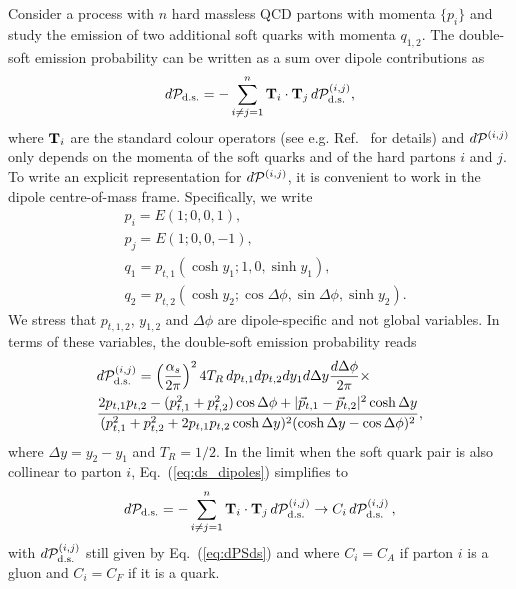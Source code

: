 \documentclass[nofootinbib,twocolumn,preprintnumbers,superscriptaddress,aps]{revtex4-2}
\newcommand{\as}{\alpha_s}
\begin{document}
Consider a process with $n$ hard
massless QCD partons with momenta $\{p_i\}$ and study the emission of
two additional soft quarks with momenta $q_{1,2}$. The double-soft
emission probability can be written as a sum over dipole contributions
as
\begin{equation}
  d\mathcal P_{\rm d.s.} = -\sum_{i\ne j=1}^{n} {\bf T}_i \cdot {\bf T}_j\,
  d\mathcal P^{(i,j)}_{\rm d.s.},
  \label{eq:ds_dipoles}
\end{equation}
where ${\bf T}_i$ are the standard colour operators (see
e.g. Ref.~\cite{Catani:1996vz} for details) and $d\mathcal P^{(i,j)}_{\rm}$ only
depends on the momenta of the soft quarks and of the hard partons $i$
and $j$. To write an explicit representation for $d\mathcal
P^{(i,j)}_{\rm}$, it is convenient to work in the dipole
centre-of-mass frame. Specifically, we write
\begin{align}
  & p_i = E(1;0,0,1),
  \nonumber\\
  & p_j = E(1;0,0,-1),
  \nonumber\\
  & q_1 = p_{t,1} (\cosh y_1;1,0,\sinh y_1),
  \nonumber\\
  & q_2 = p_{t,2} (\cosh y_2;\cos\Delta\phi,\sin\Delta\phi,\sinh y_2).
\end{align}
We stress that $p_{t,{1,2}}$, $y_{1,2}$ and $\Delta\phi$ are dipole-specific
and not global variables.
In terms of these variables, the double-soft emission probability reads
\begin{align}
  \label{eq:dPSds}
  &
  d\mathcal P^{(i,j)}_{\rm d.s.} = 
  \left(\frac{\as}{2\pi}\right)^2
  4  T_R\,
  d p_{t,1} d p_{t,2} d y_1 d\Delta y \frac{d\Delta\phi}{2\pi}\times
  \\
  &
  \frac{2 p_{t,1}p_{t,2} - (p^2_{t,1}+p^2_{t,2})\cos\Delta\phi +
    |\vec p_{t,1}-\vec p_{t,2}|^2 \cosh\Delta y}
       {(p_{t,1}^2 + p_{t,2}^2 + 2 p_{t,1}  p_{t,2} \cosh\Delta y)^2
         (\cosh\Delta y-\cos\Delta\phi)^2},
       \nonumber
\end{align}
where $\Delta y = y_2-y_1$ and $T_R= 1/2$. In the limit when the soft quark
pair is also collinear to parton $i$, Eq.~(\ref{eq:ds_dipoles}) simplifies
to
\begin{equation}
  d\mathcal P_{\rm d.s.} = -\sum_{i\ne j=1}^{n} {\bf T}_i \cdot {\bf T}_j\,
  d\mathcal P^{(i,j)}_{\rm d.s.}
  \to
  C_i \,d\mathcal P^{(i,j)}_{\rm d.s.}\,,
\end{equation}
with $d\mathcal P^{(i,j)}_{\rm d.s.}$ still given by Eq.~(\ref{eq:dPSds}) and
where $C_i = C_A$ if parton $i$ is a gluon and $C_i=C_F$ if it is a quark.
\end{document}
